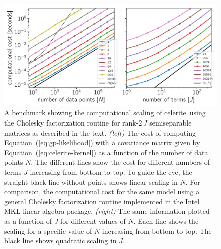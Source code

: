 \documentclass[manuscript, letterpaper]{aastex6}
\makeatletter
\let\origsection\section
\renewcommand\section{\@ifstar{\starsection}{\nostarsection}}
\newcommand\nostarsection[1]{\sectionprelude\origsection{#1}}
\newcommand\starsection[1]{\sectionprelude\origsection*{#1}}
\newcommand\sectionprelude{\vspace{1em}}
\newcommand{\project}[1]{\textsf{#1}}
\newcommand{\celerite}{\project{celerite}}
\newcommand{\figurelabel}[1]{\label{fig:#1}}
\renewcommand{\eqref}[1]{\ref{eq:#1}}
\newcommand{\Eq}[1]{Equation~(\eqref{#1})}
\newcommand{\eq}[1]{\Eq{#1}}
\newcommand{\sectlabel}[1]{\label{sect:#1}}
\makeatother
\begin{document}
\begin{figure}[tp]
\begin{center}
\includegraphics[width=\textwidth]{figures/benchmark_darwin.pdf}
\caption{A benchmark showing the computational scaling of \celerite\ using the
    Cholesky factorization routine for rank-$2\,J$ semiseparable matrices as
    described in the text.
    \emph{(left)} The cost of computing \eq{gp-likelihood} with a covariance
    matrix given by \eq{celerite-kernel} as a function of the number of data
    points $N$.
    The different lines show the cost for different numbers of terms $J$
    increasing from bottom to top.
    To guide the eye, the straight black line without points
    shows linear scaling in $N$.
    For comparison, the computational cost for the same model using a general
    Cholesky factorization routine implemented in the Intel MKL linear algebra
    package.
    \emph{(right)} The same information plotted as a function of $J$ for
    different values of $N$.
    Each line shows the scaling for a specific value of $N$ increasing from
    bottom to top.
    The black line shows quadratic scaling in $J$.
    \figurelabel{benchmark}}
\end{center}
\end{figure}


\section{Examples}\sectlabel{examples}
\end{document}
